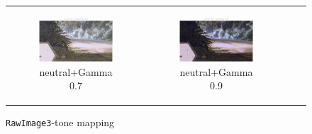 \documentclass[11pt, a4]{article}
\begin{document}
\begin{enumerate}
\begin{enumerate}
\begin{figure}[h]
{\begin{tabular}{cccc}
\begin{subfigure}[h]{0.45\linewidth}
							\includegraphics[width=\linewidth]{../output/RawImage3_Tone_neutral_Gamma0.5.pdf}
							\caption{neutral+Gamma 0.7}
							\label{fig:RawImage3_tone_11}
						\end{subfigure} &
						\begin{subfigure}[h]{0.45\linewidth}
							\centering
							\includegraphics[width=\linewidth]{../output/RawImage3_Tone_neutral_Gamma0.9.pdf}
							\caption{neutral+Gamma 0.9}
							\label{fig:RawImage3_tone_12}
						\end{subfigure}
					\end{tabular}
				}
				\caption{\texttt{RawImage3}-tone mapping}
				\label{fig:RawImage3_tone}
			\end{figure}
		\end{enumerate}
	\end{enumerate}
\end{document}
